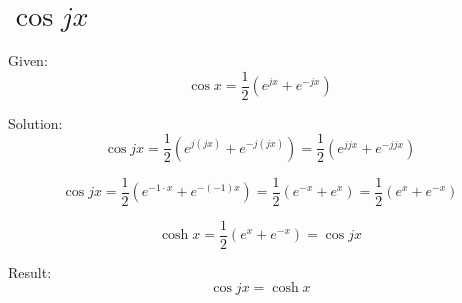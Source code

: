 \documentclass[a4paper, 10pt]{scrartcl}
\begin{document}
\section{$\cos{jx}$}

Given:
\[\cos{x} = \frac{1}{2}(e^{jx} + e^{-jx})\]

Solution:
\[\cos{jx} = \frac{1}{2}(e^{j(jx)} + e^{-j(jx)}) =
             \frac{1}{2}(e^{jjx} + e^{-jjx})\]

\[\cos{jx} = \frac{1}{2}(e^{-1\cdot x} + e^{-(-1)x}) =
             \frac{1}{2}(e^{-x} + e^{x}) = \frac{1}{2}(e^{x} + e^{-x})\]

\[\cosh{x} = \frac{1}{2}(e^{x} + e^{-x}) = \cos{jx}\]

Result:
\[\cos{jx} = \cosh{x}\]
\end{document}

